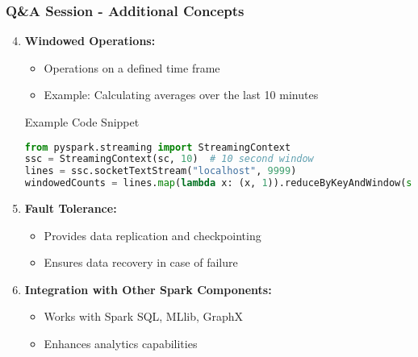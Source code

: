 \documentclass[aspectratio=169]{beamer}
\begin{document}
\begin{frame}[fragile]
    \frametitle{Q\&A Session - Additional Concepts}
    \begin{enumerate}
        \setcounter{enumii}{3}
        \item \textbf{Windowed Operations:}
        \begin{itemize}
            \item Operations on a defined time frame
            \item Example: Calculating averages over the last 10 minutes
        \end{itemize}
        \begin{block}{Example Code Snippet}
            \begin{lstlisting}[language=python]
from pyspark.streaming import StreamingContext
ssc = StreamingContext(sc, 10)  # 10 second window
lines = ssc.socketTextStream("localhost", 9999)
windowedCounts = lines.map(lambda x: (x, 1)).reduceByKeyAndWindow(sum, None, 60, 10)
            \end{lstlisting}
        \end{block}

        \item \textbf{Fault Tolerance:}
        \begin{itemize}
            \item Provides data replication and checkpointing
            \item Ensures data recovery in case of failure
        \end{itemize}

        \item \textbf{Integration with Other Spark Components:}
        \begin{itemize}
            \item Works with Spark SQL, MLlib, GraphX
            \item Enhances analytics capabilities
        \end{itemize}
    \end{enumerate}
\end{frame}
\end{document}

